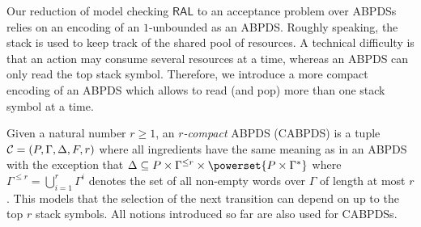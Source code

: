 \documentclass{llncs}
\newcommand{\rbmi}{\acro{iRBM}}
\newcommand{\ral}{\ensuremath{\mathsf{RAL}}\xspace}
\begin{document}
Our reduction of model checking \ral to an acceptance problem over ABPDSs relies on an encoding of an $1$-unbounded {\rbmi} as an ABPDS. Roughly speaking, the stack is used to keep track of the shared pool of resources. A technical difficulty is that an action may consume several resources at a time, whereas an ABPDS can only read the top stack symbol. Therefore, we introduce a more compact encoding of an ABPDS which allows to read (and pop) more than one stack symbol at a time. 

Given  a natural number $r\geq 1$, an \emph{$r$-compact} ABPDS (CABPDS) is a tuple $\mathcal{C}=(P,\Gamma,\Delta,F,r)$ where all ingredients have the same meaning as in an  ABPDS with the exception that $\Delta \subseteq P\times \Gamma^{\leq r} \times \powerset{P\times\Gamma^*}$ where $\Gamma^{\leq r} = \bigcup_{i=1}^r\Gamma^i$ denotes the set of all non-empty words over $\Gamma$ of length at most $r$. This models that the selection of the next transition can depend on up to the top $r$ stack symbols. All notions introduced so far are also used for CABPDSs.  \full{\\ }
\end{document}
